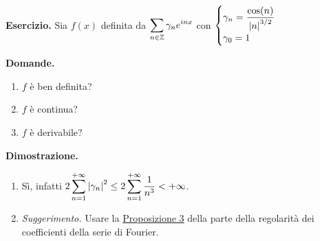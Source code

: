 \textbf{Esercizio.} Sia $f(x)$ definita da $\displaystyle \sum_{n \in \mathbb Z} \gamma_n e^{inx} $ con $\ds  %
\begin{cases}
	\ds \gamma_n = \frac{\cos(n)}{\left| n \right|^{3 / 2}} \\
	\gamma_0 = 1
\end{cases}
$

\textbf{Domande.}
\begin{enumerate}
\item $f$ è ben definita?

\item $f$ è continua?

\item $f$ è derivabile?
\end{enumerate}

\textbf{Dimostrazione.}
\begin{enumerate}

	\item Sì, infatti $\displaystyle 2 \sum_{n=1}^{+\infty} \left| \gamma_n \right|^2 \leq 2 \sum_{n=1}^{+\infty} \frac{1}{n^3} < +\infty $.


	\item \textit{Suggerimento.} Usare la \hyperlink{prop:2021-08nov_prop_3}{Proposizione 3} della parte della regolarità dei coefficienti della serie di Fourier.

\end{enumerate}
